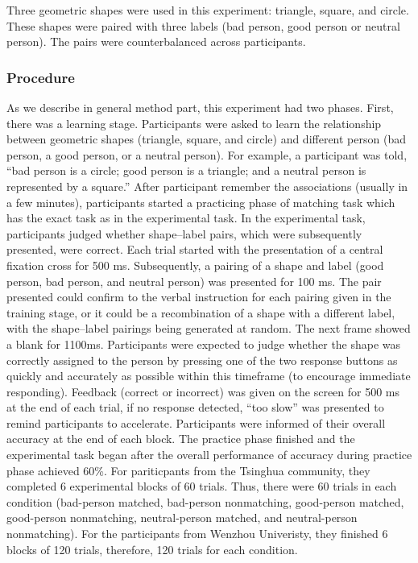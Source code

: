 \documentclass[man]{apa6}
\begin{document}
Three geometric shapes were used in this experiment: triangle, square, and circle. These shapes were paired with three labels (bad person, good person or neutral person). The pairs were counterbalanced across participants.

\hypertarget{procedure}{%
\subsubsection{Procedure}\label{procedure}}

As we describe in general method part, this experiment had two phases. First, there was a learning stage. Participants were asked to learn the relationship between geometric shapes (triangle, square, and circle) and different person (bad person, a good person, or a neutral person). For example, a participant was told, \enquote{bad person is a circle; good person is a triangle; and a neutral person is represented by a square.} After participant remember the associations (usually in a few minutes), participants started a practicing phase of matching task which has the exact task as in the experimental task.
In the experimental task, participants judged whether shape--label pairs, which were subsequently presented, were correct. Each trial started with the presentation of a central fixation cross for 500 ms. Subsequently, a pairing of a shape and label (good person, bad person, and neutral person) was presented for 100 ms. The pair presented could confirm to the verbal instruction for each pairing given in the training stage, or it could be a recombination of a shape with a different label, with the shape--label pairings being generated at random. The next frame showed a blank for 1100ms. Participants were expected to judge whether the shape was correctly assigned to the person by pressing one of the two response buttons as quickly and accurately as possible within this timeframe (to encourage immediate responding). Feedback (correct or incorrect) was given on the screen for 500 ms at the end of each trial, if no response detected, \enquote{too slow} was presented to remind participants to accelerate. Participants were informed of their overall accuracy at the end of each block. The practice phase finished and the experimental task began after the overall performance of accuracy during practice phase achieved 60\%.
For pariticpants from the Tsinghua community, they completed 6 experimental blocks of 60 trials. Thus, there were 60 trials in each condition (bad-person matched, bad-person nonmatching, good-person matched, good-person nonmatching, neutral-person matched, and neutral-person nonmatching). For the participants from Wenzhou Univeristy, they finished 6 blocks of 120 trials, therefore, 120 trials for each condition.
\end{document}
